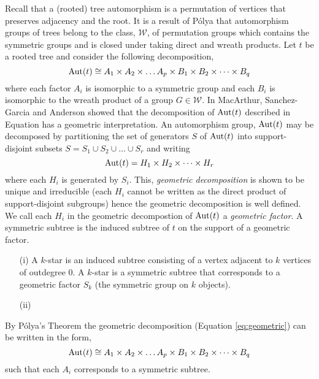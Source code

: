 Recall that a (rooted) tree automorphism is a permutation of vertices that preserves adjacency and the root.  It is a result of P\'{o}lya that automorphism 
groups of trees belong to the class, $\mathcal{W}$, of permutation groups which contains the symmetric groups and is closed under taking direct and wreath products.  Let $t$ 
be a rooted tree and consider the following decomposition,
\begin{equation}\label{eq:decomposition}
 \operatorname{Aut}(t) \cong A_1 \times A_2 \times \dots A_p \times B_1 \times B_2 \times \dots \times B_q  
\end{equation}
where each factor $A_i$ is isomorphic to a symmetric group and each $B_i$ is isomorphic to the wreath product of a group $G \in \mathcal{W}$.  In \cite{} MacArthur, 
Sanchez-Garcia and Anderson showed that the decomposition of $\operatorname{Aut}(t)$ described in Equation \label{eq:decomposition} has a geometric interpretation.  An 
automorphism group, $\operatorname{Aut}(t)$ may be decomposed by partitioning the set of generators $S$ of $\operatorname{Aut}(t)$ into support-disjoint subsets 
$S = S_1 \cup S_2 \cup \dots \cup S_r$ and writing
\begin{equation}\label{eq:geometric}
 \operatorname{Aut}(t) = H_1 \times H_2 \times \dots \times H_r
\end{equation}
where each $H_i$ is generated by $S_i$.  This, \emph{geometric decomposition} is shown \cite{} to be unique and irreducible (each $H_i$ cannot be written as the direct product of support-disjoint subgroups) hence the geometric decomposition is well defined. We call each $H_i$ in the geometric decompostion of $\operatorname{Aut}(t)$ a \emph{geometric factor}. A symmetric subtree is the induced subtree of $t$ on the support of a geometric factor.
\begin{ex}
\begin{itemize}
 \item[(i)]  A $k$-star is an induced subtree consisting of a vertex adjacent to $k$ vertices of outdegree 0.  A $k$-star is a symmetric subtree that corresponds to a geometric factor $S_k$ (the symmetric group on $k$ objects).  
 \item[(ii)] %
\end{itemize}
\end{ex}
By P\'{o}lya's Theorem the geometric decomposition (Equation \ref{eq:geometric}) can be written in the form,
\begin{equation}
 \operatorname{Aut}(t) \cong A_1 \times A_2 \times \dots A_p \times B_1 \times B_2 \times \dots \times B_q  
\end{equation}
such that each $A_i$ corresponds to a symmetric subtree.  

